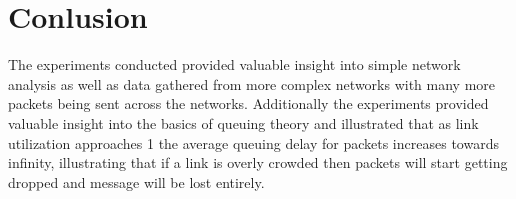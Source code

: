 \documentclass[12pt]{article}
\begin{document}
\section{Conlusion}
The experiments conducted provided valuable insight into simple network analysis as well as data gathered from more complex networks with many more packets being sent across the networks. Additionally the experiments provided valuable insight into the basics of queuing theory and illustrated that as link utilization approaches 1 the average queuing delay for packets increases towards infinity, illustrating that if a link is overly crowded then packets will start getting dropped and message will be lost entirely. 
\end{document}
